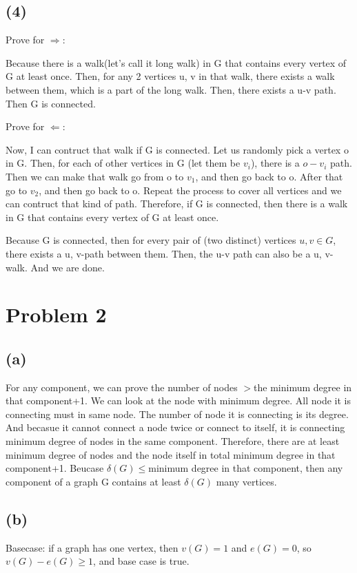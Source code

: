 \documentclass[11pt]{article}
\begin{document}
\subsection*{(4)}

Prove for $\Rightarrow $:

Because there is a walk(let's call it long walk) in G that contains every vertex of G at least once. Then, for any 2 vertices u, v in that walk, there exists a walk between them, which is a part of the long walk. Then, there exists a u-v path. Then G is connected. 

Prove for $\Leftarrow  $:


Now, I can contruct that walk if G is connected. Let us randomly pick a vertex o in G. Then, for each of other vertices in G (let them be \(v_{i}\)), there is a \(o-v_{i}\) path. Then we can make that walk go from o to \(v_{1}\), and then go back to o. After that go to  \(v_{2}\), and then go back to o. Repeat the process to cover all vertices and we can contruct that kind of path. Therefore, if G is connected, then there is a walk in G that contains every vertex of G at least once.



Because G is connected, then for every pair of (two distinct) vertices \(u ,v \in G\), there exists a u, v-path between them. Then, the u-v path can also be a u, v-walk. And we are done.


\section{Problem 2}
\subsection{(a)}
For any component, we can prove the number of nodes \(>\)the minimum degree in that component+1. We can look at the node with minimum degree. All node it is connecting must in same node. The number of node it is connecting is its degree. And becasue it cannot connect a node twice or connect to itself, it is connecting minimum degree of nodes in the same component. Therefore, there are at least minimum degree of nodes and the node itself in total minimum degree in that component+1. Beucase \(\delta(G)\le\)minimum degree in that component, then any component of a graph G contains at least \(\delta(G)\) many vertices.

\subsection{(b)}
Basecase: if a graph has one vertex, then \(v(G)=1\) and \(e(G)=0\), so \(v(G)-e(G)\ge1\), and base case is true.
\end{document}
